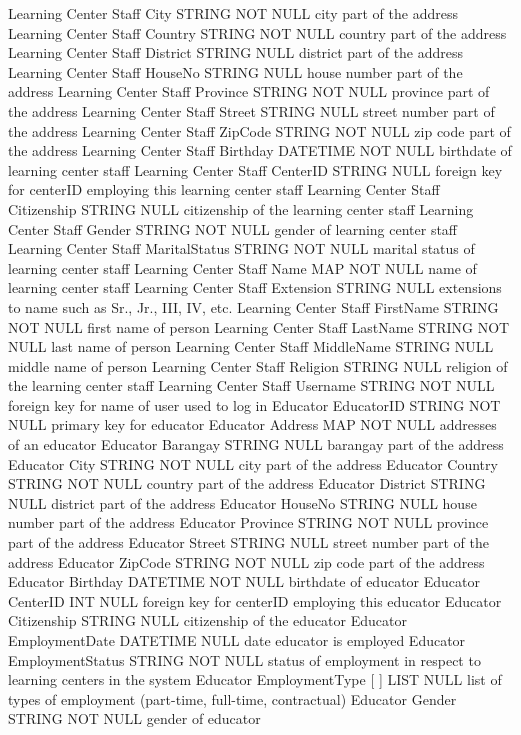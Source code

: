 Learning Center Staff		City	STRING	NOT NULL	city part of the address
Learning Center Staff		Country	STRING	NOT NULL	country part of the address
Learning Center Staff		District	STRING	NULL	district part of the address
Learning Center Staff		HouseNo	STRING	NULL	house number part of the address
Learning Center Staff		Province	STRING	NOT NULL	province part of the address
Learning Center Staff		Street	STRING	NULL	street number part of the address
Learning Center Staff		ZipCode	STRING	NOT NULL	zip code part of the address
Learning Center Staff	Birthday	DATETIME	NOT NULL	birthdate of learning center staff
Learning Center Staff	CenterID	STRING	NULL	foreign key for centerID employing this learning center staff
Learning Center Staff	Citizenship	STRING	NULL	citizenship of the learning center staff
Learning Center Staff	Gender	STRING	NOT NULL	gender of learning center staff
Learning Center Staff	MaritalStatus	STRING	NOT NULL	marital status of learning center staff
Learning Center Staff	Name { }	MAP	NOT NULL	name of learning center staff
Learning Center Staff	 	Extension	STRING	NULL	extensions to name such as Sr., Jr., III, IV, etc.
Learning Center Staff		FirstName	STRING	NOT NULL	first name of person
Learning Center Staff		LastName	STRING	NOT NULL	last name of person
Learning Center Staff		MiddleName	STRING	NULL	middle name of person
Learning Center Staff	Religion	STRING	NULL	religion of the learning center staff
Learning Center Staff	Username	STRING	NOT NULL	foreign key for name of user used to log in
Educator	EducatorID	STRING	NOT NULL	primary key for educator
Educator	Address { }	MAP	NOT NULL	addresses of an educator
Educator	 	Barangay	STRING	NULL	barangay part of the address
Educator		City	STRING	NOT NULL	city part of the address
Educator		Country	STRING	NOT NULL	country part of the address
Educator		District	STRING	NULL	district part of the address
Educator		HouseNo	STRING	NULL	house number part of the address
Educator		Province	STRING	NOT NULL	province part of the address
Educator		Street	STRING	NULL	street number part of the address
Educator		ZipCode	STRING	NOT NULL	zip code part of the address
Educator	Birthday	DATETIME	NOT NULL	birthdate of educator
Educator	CenterID	INT	NULL	foreign key for centerID employing this educator
Educator	Citizenship	STRING	NULL	citizenship of the educator
Educator	EmploymentDate	DATETIME	NULL	date educator is employed
Educator	EmploymentStatus	STRING	NOT NULL	status of employment in respect to learning centers in the system
Educator	EmploymentType [ ]	LIST	NULL	list of types of employment (part-time, full-time, contractual)
Educator	Gender	STRING	NOT NULL	gender of educator
